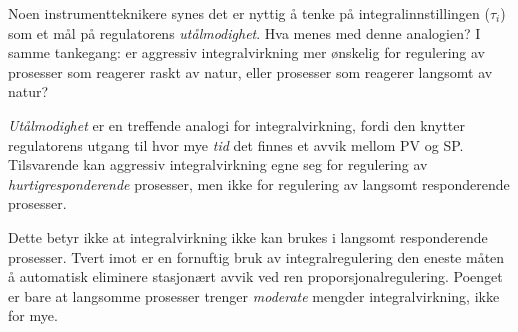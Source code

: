 
Noen instrumentteknikere synes det er nyttig å tenke på integralinnstillingen ($\tau_i$) som et mål på regulatorens {\it utålmodighet}. Hva menes med denne analogien? I samme tankegang: er aggressiv integralvirkning mer ønskelig for regulering av prosesser som reagerer raskt av natur, eller prosesser som reagerer langsomt av natur?







{\it Utålmodighet} er en treffende analogi for integralvirkning, fordi den knytter regulatorens utgang til hvor mye {\it tid} det finnes et avvik mellom PV og SP. Tilsvarende kan aggressiv integralvirkning egne seg for regulering av {\it hurtigresponderende} prosesser, men ikke for regulering av langsomt responderende prosesser.







Dette betyr ikke at integralvirkning ikke kan brukes i langsomt responderende prosesser. Tvert imot er en fornuftig bruk av integralregulering den eneste måten å automatisk eliminere stasjonært avvik ved ren proporsjonalregulering. Poenget er bare at langsomme prosesser trenger {\it moderate} mengder integralvirkning, ikke for mye.


